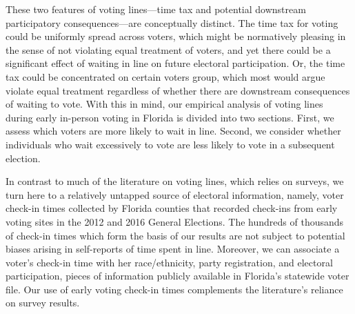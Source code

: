 \documentclass[12pt,titlepage]{article}
\begin{document}


These two features of voting lines---time tax and potential downstream
participatory consequences---are conceptually distinct. The time tax
for voting could be uniformly spread across voters, which might be
normatively pleasing in the sense of not violating equal treatment of
voters, and yet there could be a significant effect of waiting in line
on future electoral participation. Or, the time tax could be
concentrated on certain voters group, which most would argue violate
equal treatment regardless of whether there are downstream
consequences of waiting to vote. With this in mind, our empirical
analysis of voting lines during early in-person voting in Florida is
divided into two sections. First, we assess which voters are more
likely to wait in line. Second, we consider whether individuals who
wait excessively to vote are less likely to vote in a subsequent
election.



In contrast to much of the literature on voting lines, which relies on
surveys, we turn here to a relatively untapped source of electoral
information, namely, voter check-in times collected by Florida
counties that recorded check-ins from early voting sites in the 2012
and 2016 General Elections.  The hundreds of thousands of check-in
times which form the basis of our results are not subject to potential
biases arising in self-reports of time spent in line.  Moreover, we
can associate a voter's check-in time with her race/ethnicity, party
registration, and electoral participation, pieces of information
publicly available in Florida's statewide voter file.  Our use of
early voting check-in times complements the literature's reliance on
survey results.
\end{document}
